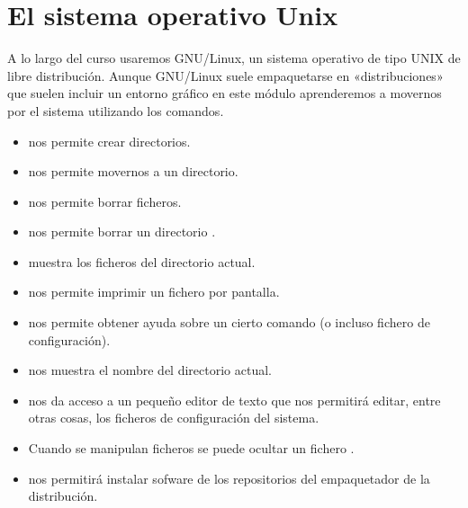 \documentclass[letterpaper,10pt,spanish]{sphinxmanual}
\begin{document}
\section{El sistema operativo Unix}
\label{\detokenize{tema_pautas_seguridad_informatica/tema_pautas_seguridad_informatica:el-sistema-operativo-unix}}
A lo largo del curso usaremos GNU/Linux, un sistema operativo de tipo UNIX de libre distribución. Aunque GNU/Linux suele empaquetarse en «distribuciones» que suelen incluir un entorno gráfico en este módulo aprenderemos a movernos por el sistema utilizando los comandos.
\begin{itemize}
\item {} 
 nos permite crear directorios.

\item {} 
 nos permite movernos a un directorio.

\item {} 
 nos permite borrar ficheros.

\item {} 
 nos permite borrar un directorio .

\item {} 
 muestra los ficheros del directorio actual.

\item {} 
 nos permite imprimir un fichero por pantalla.

\item {} 
 nos permite obtener ayuda sobre un cierto comando (o incluso fichero de configuración).

\item {} 
 nos muestra el nombre del directorio actual.

\item {} 
 nos da acceso a un pequeño editor de texto que nos permitirá editar, entre otras cosas, los ficheros de configuración del sistema.

\item {} 
Cuando se manipulan ficheros se puede ocultar un fichero .

\item {} 
 nos permitirá instalar sofware de los repositorios del empaquetador de la distribución.


\end{itemize}
\end{document}
